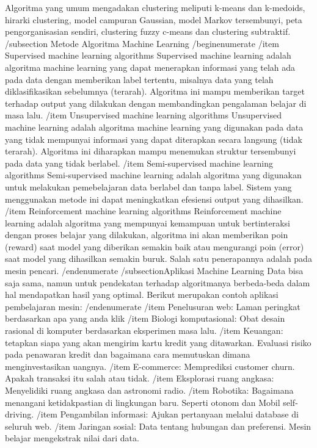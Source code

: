 Algoritma yang umum mengadakan clustering meliputi k-means dan k-medoids, hirarki clustering, model campuran Gaussian, model Markov tersembunyi, peta pengorganisasian sendiri, clustering fuzzy c-means dan clustering subtraktif.
/subsection {Metode Algoritma Machine Learning} 
/begin{enumerate}
/item Supervised machine learning algorithms
Supervised machine learning adalah algoritma machine learning yang dapat menerapkan informasi yang telah ada pada data dengan memberikan label tertentu, misalnya data yang telah diklasifikasikan sebelumnya (terarah). Algoritma ini mampu memberikan target terhadap output yang dilakukan dengan membandingkan pengalaman belajar di masa lalu.
/item Unsupervised machine learning algorithms
Unsupervised machine learning adalah algoritma machine learning yang digunakan pada data yang tidak mempunyai informasi yang dapat diterapkan secara langsung (tidak terarah). Algoritma ini diharapkan mampu menemukan struktur tersembunyi pada data yang tidak berlabel.
/item Semi-supervised machine learning algorithms
Semi-supervised machine learning adalah algoritma yang digunakan untuk melakukan pemebelajaran data berlabel dan tanpa label. Sistem yang menggunakan metode ini dapat meningkatkan efesiensi output yang dihasilkan.
/item Reinforcement machine learning algorithms
Reinforcement machine learning adalah algoritma yang mempunyai kemampuan untuk bertinteraksi dengan proses belajar yang dilakukan, algoritma ini akan memberikan poin (reward) saat model yang diberikan semakin baik atau mengurangi poin (error) saat model yang dihasilkan semakin buruk. Salah satu penerapannya adalah pada mesin pencari.
/end{enumerate}
/subsection{Aplikasi Machine Learning} 
Data bisa saja sama, namun untuk pendekatan terhadap algoritmanya berbeda-beda dalam hal  mendapatkan hasil yang optimal. Berikut merupakan contoh aplikasi pembelajaran mesin:
/end{enumerate}
/item Penelusuran web: Laman peringkat berdasarkan apa yang anda klik
/item Biologi komputasional: Obat desain rasional di komputer berdasarkan eksperimen masa lalu.
/item Keuangan: tetapkan siapa yang akan mengirim kartu kredit yang ditawarkan. Evaluasi risiko pada penawaran kredit dan bagaimana cara memutuskan dimana menginvestasikan uangnya.
/item E-commerce: Memprediksi customer churn. Apakah transaksi itu salah atau tidak.
/item Eksplorasi ruang angkasa: Menyelidiki ruang angkasa dan astronomi radio.
/item Robotika: Bagaimana menangani ketidakpastian di lingkungan baru. Seperti otonom dan Mobil self-driving.
/item Pengambilan informasi: Ajukan pertanyaan melalui database di seluruh web.
/item Jaringan sosial: Data tentang hubungan dan preferensi. Mesin belajar mengekstrak nilai dari data.
